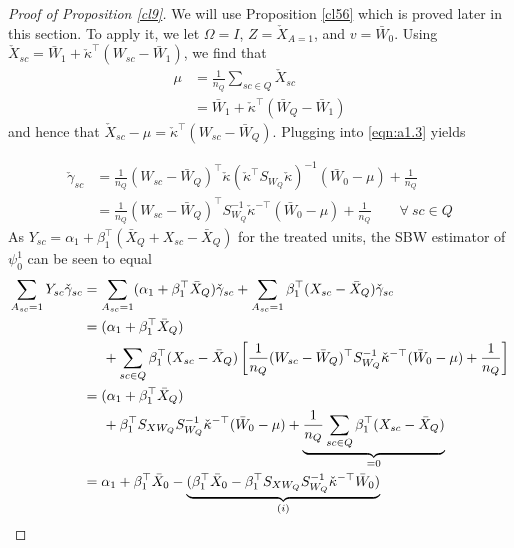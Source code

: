 \begin{proof}[Proof of Proposition \ref{cl9}]

We will use Proposition \ref{cl56} which is proved later in this section. To apply it, we let $\Omega = I$, $Z = \check{X}_{A=1}$, and $v = \bar{W}_0$. Using  $\check{X}_{sc} = \bar{W}_1 + \check{\kappa}^\top(W_{sc} - \bar{W}_1)$, we find that 
\begin{align}
    \nonumber \mu & = \frac{1}{n_Q} \sum_{sc \in Q} \check{X}_{sc} \\
    \label{eqn:cl9.mu} & = \bar{W}_1 + \check{\kappa}^\top(\bar{W}_Q - \bar{W}_1)
\end{align}
and hence that $\check{X}_{sc} - \mu = \check{\kappa}^\top(W_{sc} - \bar{W}_Q)$. Plugging into \eqref{eqn:a1.3} yields 

\begin{align}
 \nonumber \check{\gamma}_{sc} & = \frac{1}{n_Q}(W_{sc} - \bar{W}_Q)^\top \check{\kappa} (\check{\kappa}^\top S_{W_Q} \check{\kappa})^{-1}(\bar{W}_0 - \mu) + \frac{1}{n_Q} \\
 \label{eqn:cl9.proof.gamma}& = \frac{1}{n_Q}(W_{sc} - \bar{W}_Q)^\top S_{W_Q}^{-1} \check{\kappa}^{-\top}(\bar{W}_0 - \mu) + \frac{1}{n_Q} \qquad \forall \ sc \in Q
\end{align}
As $Y_{sc} = \alpha_1 + \beta_1^\top (\bar{X}_Q + X_{sc} - \bar{X}_Q)$ for the treated units, the SBW estimator of $\psi_0^1$ can be seen to equal
\begin{align}
    \nonumber \sum_{A_{sc}=1} Y_{sc}\check{\gamma}_{sc} & = \sum_{A_{sc}=1} (\alpha_1 + \beta_1^\top \bar{X}_Q) \check{\gamma}_{sc} + \sum_{A_{sc}=1}  \beta_1^\top (X_{sc} - \bar{X}_Q)\check{\gamma}_{sc} \\
 \label{eqn:cl9.proof1}    & = (\alpha_1 + \beta_1^\top \bar{X}_Q)\\
    \nonumber & \hskip.5cm {} + \sum_{sc \in Q}  \beta_1^\top (X_{sc} - \bar{X}_Q)\left[\frac{1}{n_Q} (W_{sc} - \bar{W}_Q)^\top S_{W_Q}^{-1} \check{\kappa}^{-\top}(\bar{W}_0 - \mu) +  \frac{1}{n_Q}\right] \\
\label{eqn:cl9.proof2}    & = (\alpha_1 + \beta_1^\top \bar{X}_Q)\\
    \nonumber & \hskip.5cm {} +  \beta_1^\top S_{XW_Q} S_{W_Q}^{-1} \check{\kappa}^{-\top}(\bar{W}_0 - \mu) + \underbrace{\frac{1}{n_Q}\sum_{sc \in Q}   \beta_1^\top (X_{sc} - \bar{X}_Q) }_{= 0} \\ 
\label{eqn:cl9.proof3}    & = \alpha_1 + \beta_1^\top \bar{X}_0 - \underbrace{(\beta_1^\top \bar{X}_0 -  \beta_1^\top S_{XW_Q} S_{W_Q}^{-1} \check{\kappa}^{-\top}\bar{W}_0)}_{(i)} \\

\end{align}
\end{proof}
